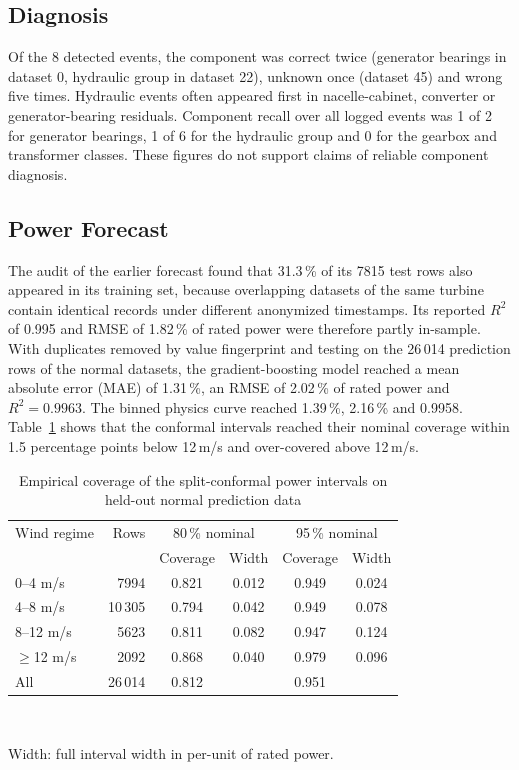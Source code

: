 \documentclass[conference]{IEEEtran}
\begin{document}
\subsection{Diagnosis}
Of the 8 detected events, the component was correct twice (generator bearings in dataset 0, hydraulic group in dataset 22), unknown once (dataset 45) and wrong five times. Hydraulic events often appeared first in nacelle-cabinet, converter or generator-bearing residuals. Component recall over all logged events was 1 of 2 for generator bearings, 1 of 6 for the hydraulic group and 0 for the gearbox and transformer classes. These figures do not support claims of reliable component diagnosis.

\subsection{Power Forecast}
The audit of the earlier forecast found that 31.3\,\% of its 7815 test rows also appeared in its training set, because overlapping datasets of the same turbine contain identical records under different anonymized timestamps. Its reported $R^2$ of 0.995 and RMSE of 1.82\,\% of rated power were therefore partly in-sample. With duplicates removed by value fingerprint and testing on the 26\,014 prediction rows of the normal datasets, the gradient-boosting model reached a mean absolute error (MAE) of 1.31\,\%, an RMSE of 2.02\,\% of rated power and $R^2=0.9963$. The binned physics curve reached 1.39\,\%, 2.16\,\% and 0.9958. Table~\ref{tab:cov} shows that the conformal intervals reached their nominal coverage within 1.5 percentage points below 12\,m/s and over-covered above 12\,m/s.

\begin{table}[t]
\caption{Empirical coverage of the split-conformal power intervals on held-out normal prediction data}
\label{tab:cov}
\centering
\footnotesize
\begin{tabular}{@{}lrcccc@{}}
\toprule
Wind regime & Rows & \multicolumn{2}{c}{80\,\% nominal} & \multicolumn{2}{c}{95\,\% nominal} \\
 & & Coverage & Width & Coverage & Width \\
\midrule
0--4 m/s & 7994 & 0.821 & 0.012 & 0.949 & 0.024 \\
4--8 m/s & 10\,305 & 0.794 & 0.042 & 0.949 & 0.078 \\
8--12 m/s & 5623 & 0.811 & 0.082 & 0.947 & 0.124 \\
$\geq$12 m/s & 2092 & 0.868 & 0.040 & 0.979 & 0.096 \\
\midrule
All & 26\,014 & 0.812 & & 0.951 & \\
\bottomrule
\end{tabular}
\\[2pt]
\parbox{\columnwidth}{\scriptsize Width: full interval width in per-unit of rated power.}
\end{table}
\end{document}
